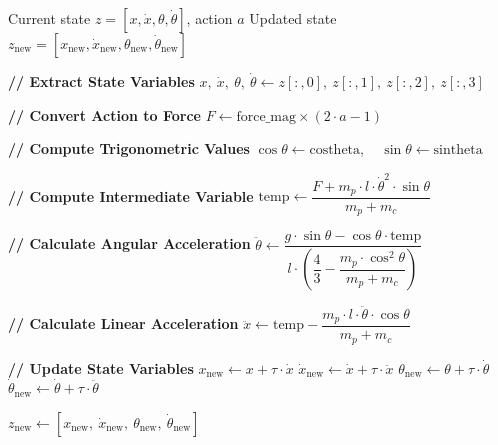 \documentclass[nonacm,sigconf]{acmart}
\begin{document}

\newpage


\begin{algorithm}[h]
\caption{Dynamics of Cart Pole}
\label{alg:pendulum_dynamics}
\begin{algorithmic}[1]
\Require Current state $z = [x, \dot{x}, \theta, \dot{\theta}]$, action $a$
\Ensure  Updated state $z_{\text{new}} = [x_{\text{new}}, \dot{x}_{\text{new}}, \theta_{\text{new}}, \dot{\theta}_{\text{new}}]$

\State \textbf{// Extract State Variables}
\State $x,\ \dot{x},\ \theta,\ \dot{\theta}
       \gets z[:,0],\ z[:,1],\ z[:,2],\ z[:,3]$

\State \textbf{// Convert Action to Force}
\State $F \gets \text{force\_mag} \times (2 \cdot a - 1)$

\State \textbf{// Compute Trigonometric Values}
\State $\cos\theta \gets \text{costheta},\quad \sin\theta \gets \text{sintheta}$

\State \textbf{// Compute Intermediate Variable}
\State $\text{temp} \gets
       \dfrac{F + m_p \cdot l \cdot \dot{\theta}^2 \cdot \sin\theta}
             {m_p + m_c}$

\State \textbf{// Calculate Angular Acceleration}
\State $\ddot{\theta} \gets
       \dfrac{g \cdot \sin\theta - \cos\theta \cdot \text{temp}}
             {l \cdot \left(\dfrac{4}{3}
              - \dfrac{m_p \cdot \cos^2\!\theta}{m_p + m_c}\right)}$

\State \textbf{// Calculate Linear Acceleration}
\State $\ddot{x} \gets \text{temp}
       - \dfrac{m_p \cdot l \cdot \ddot{\theta} \cdot \cos\theta}{m_p + m_c}$

\State \textbf{// Update State Variables}
\State $x_{\text{new}}         \gets x         + \tau \cdot \dot{x}$
\State $\dot{x}_{\text{new}}   \gets \dot{x}   + \tau \cdot \ddot{x}$
\State $\theta_{\text{new}}    \gets \theta     + \tau \cdot \dot{\theta}$
\State $\dot{\theta}_{\text{new}} \gets \dot{\theta} + \tau \cdot \ddot{\theta}$

\State \Return
       $z_{\text{new}} \gets
       [x_{\text{new}},\ \dot{x}_{\text{new}},\
        \theta_{\text{new}},\ \dot{\theta}_{\text{new}}]$
\end{algorithmic}
\end{algorithm}


\end{document}
